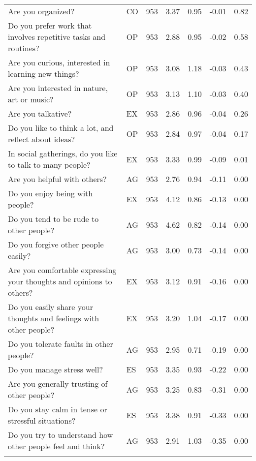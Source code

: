 \begin{table}[htbp]
{\begin{tabular}{llccccc}
    Are you organized? & CO    & 953   & 3.37  & 0.95  & -0.01 & 0.82 \\
    Do you prefer work that involves repetitive tasks and routines? & OP    & 953   & 2.88  & 0.95  & -0.02 & 0.58 \\
    Are you curious, interested in learning new things? & OP    & 953   & 3.08  & 1.18  & -0.03 & 0.43 \\
    Are you interested in nature, art or music? & OP    & 953   & 3.13  & 1.10  & -0.03 & 0.40 \\
    Are you talkative? & EX    & 953   & 2.86  & 0.96  & -0.04 & 0.26 \\
    Do you like to think a lot, and reflect about ideas? & OP    & 953   & 2.84  & 0.97  & -0.04 & 0.17 \\
    In social gatherings, do you like to talk to many people? & EX    & 953   & 3.33  & 0.99  & -0.09 & 0.01 \\
    Are you helpful with others? & AG    & 953   & 2.76  & 0.94  & -0.11 & 0.00 \\
    Do you enjoy being with people? & EX    & 953   & 4.12  & 0.86  & -0.13 & 0.00 \\
    Do you tend to be rude to other people? & AG    & 953   & 4.62  & 0.82  & -0.14 & 0.00 \\
    Do you forgive other people easily? & AG    & 953   & 3.00  & 0.73  & -0.14 & 0.00 \\
    Are you comfortable expressing your thoughts and opinions to others? & EX    & 953   & 3.12  & 0.91  & -0.16 & 0.00 \\
    Do you easily share your thoughts and feelings with other people? & EX    & 953   & 3.20  & 1.04  & -0.17 & 0.00 \\
    Do you tolerate faults in other people? & AG    & 953   & 2.95  & 0.71  & -0.19 & 0.00 \\
    Do you manage stress well? & ES    & 953   & 3.35  & 0.93  & -0.22 & 0.00 \\
    Are you generally trusting of other people? & AG    & 953   & 3.25  & 0.83  & -0.31 & 0.00 \\
    Do you stay calm in tense or stressful situations? & ES    & 953   & 3.38  & 0.91  & -0.33 & 0.00 \\
    Do you try to understand how other people feel and think? & AG    & 953   & 2.91  & 1.03  & -0.35 & 0.00 \\
    \bottomrule
	\Tablenote{7}{Most contributive \textbf{variables} are used to interpret factor: threshold at 0.4.} \\
    \end{tabular}%
	}
  \label{tab:factor4}%
\end{table}%
